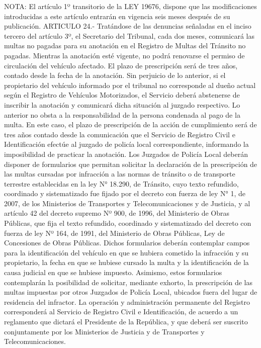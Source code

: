 NOTA:
    El artículo 1º transitorio de la LEY 19676, dispone que las modificaciones introducidas a este artículo entrarán en vigencia seis meses después de su publicación.
    ARTICULO 24.- Tratándose de las denuncias señaladas en el inciso tercero del artículo 3º, el Secretario del Tribunal, cada dos meses, comunicará las multas no pagadas para su anotación en el Registro de Multas del Tránsito no pagadas. Mientras la anotación esté vigente, no podrá renovarse el permiso de circulación del vehículo afectado. El plazo de prescripción será de tres años, contado desde la fecha de la anotación.
    Sin perjuicio de lo anterior, si el propietario del vehículo informado por el tribunal no corresponde al dueño actual según el Registro de Vehículos Motorizados, el Servicio deberá abstenerse de inscribir la anotación y comunicará dicha situación al juzgado respectivo. Lo anterior no obsta a la responsabilidad de la persona condenada al pago de la multa. En este caso, el plazo de prescripción de la acción de cumplimiento será de tres años contado desde la comunicación que el Servicio de Registro Civil e Identificación efectúe al juzgado de policía local correspondiente, informando la imposibilidad de practicar la anotación.
    Los Juzgados de Policía Local deberán disponer de formularios que permitan solicitar la declaración de la prescripción de las multas cursadas por infracción a las normas de tránsito o de transporte terrestre establecidas en la ley N° 18.290, de Tránsito, cuyo texto refundido, coordinado y sistematizado fue fijado por el decreto con fuerza de ley N° 1, de 2007, de los Ministerios de Transportes y Telecomunicaciones y de Justicia, y al artículo 42 del decreto supremo Nº 900, de 1996, del Ministerio de Obras Públicas, que fija el texto refundido, coordinado y sistematizado del decreto con fuerza de ley Nº 164, de 1991, del Ministerio de Obras Públicas, Ley de Concesiones de Obras Públicas. Dichos formularios deberán contemplar campos para la identificación del vehículo en que se hubiera cometido la infracción y su propietario, la fecha en que se hubiese cursado la multa y la identificación de la causa judicial en que se hubiese impuesto. Asimismo, estos formularios contemplarán la posibilidad de solicitar, mediante exhorto, la prescripción de las multas impuestas por otros Juzgados de Policía Local, ubicados fuera del lugar de residencia del infractor.
    La operación y administración permanente del Registro corresponderá al Servicio de Registro Civil e Identificación, de acuerdo a un reglamento que dictará el Presidente de la República, y que deberá ser suscrito conjuntamente por los Ministerios de Justicia y de Transportes y Telecomunicaciones.
